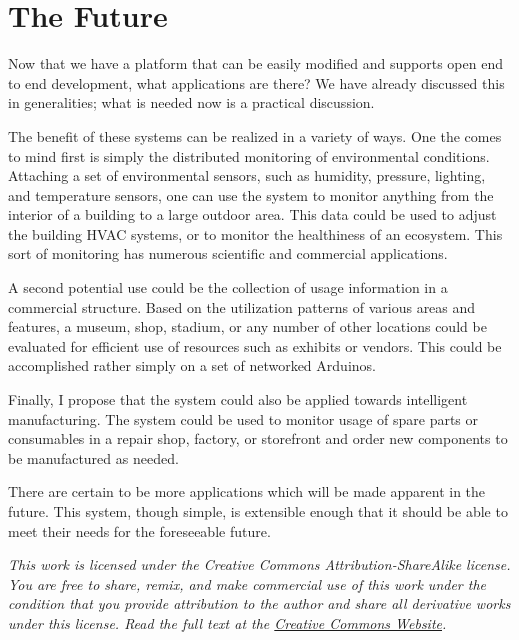 \documentclass[a4paper,10pt]{article}
\begin{document}
\section{The Future}
Now that we have a platform that can be easily modified and supports open
end to end development, what applications are there? We have already discussed
this in generalities; what is needed now is a practical discussion. 

The benefit of these systems can be realized in a variety of ways. One the comes
to mind first is simply the distributed monitoring of environmental
conditions. Attaching a set of environmental sensors, such as humidity,
pressure, lighting, and temperature sensors, one can use the system to monitor
anything from the interior of a building to a large outdoor area. This data
could be used to adjust the building HVAC systems, or to monitor the healthiness
of an ecosystem. This sort of monitoring has numerous scientific and commercial
applications.

A second potential use could be the collection of usage information in a
commercial structure. Based on the utilization patterns of various areas and
features, a museum, shop, stadium, or any number of other locations could be
evaluated for efficient use of resources such as exhibits or vendors. This could
be accomplished rather simply on a set of networked Arduinos. 

Finally, I propose that the system could also be applied towards intelligent
manufacturing. The system could be used to monitor usage of spare parts or
consumables in a repair shop, factory, or storefront and order new components to
be manufactured as needed.

There are certain to be more applications which will be made apparent in the
future. This system, though simple, is extensible enough that it should be able
to meet their needs for the foreseeable future.


\vfill
\textit{This work is licensed under the Creative Commons Attribution-ShareAlike
  license. You are free to share, remix, and make commercial use of this work
  under the condition that you provide attribution to the author and share all
  derivative works under this license. Read the full text at the
  \href{http://creativecommons.org/licenses/by-sa/3.0/}{Creative Commons Website}.}
\end{document}
